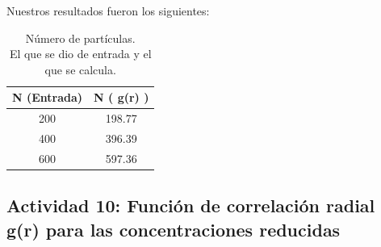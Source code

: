 \documentclass[12pt,letterpaper]{article}
\begin{document}
Nuestros resultados fueron los siguientes:
\begin{table}[H]
	\centering
	\begin{tabular}{|c|c|}
		\hline 
		N (Entrada) & N  ( g(r) ) \\ \hline 
		200 & 198.77 \\ \hline 
		400 & 396.39 \\ \hline 
		600 & 597.36 \\ \hline 
	\end{tabular} 
	\caption{Número de partículas.\\ El que se dio de entrada y el que se calcula.}
	\label{N_Particulas}
\end{table}	

\subsection*{Actividad 10: Función de correlación radial g(r) para las  concentraciones reducidas}
\end{document}
